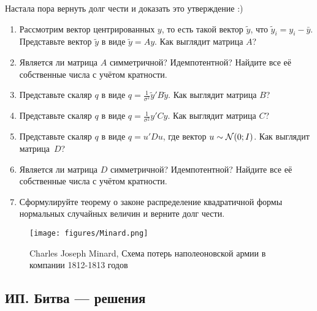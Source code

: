 \documentclass[12pt, a4paper]{article}
\theoremstyle{definition}
\begin{document}
\begin{enumerate}
Настала пора вернуть долг чести и доказать это утверждение :)

\begin{enumerate}
  \item Рассмотрим вектор центрированных $y$, то есть такой вектор $\tilde y$, что $\tilde y_i = y_i - \bar y$. Представьте вектор $\tilde y$ в виде $\tilde y = A y$. Как выглядит матрица $A$?
  \item Является ли матрица $A$ симметричной? Идемпотентной? Найдите все её собственные числа с учётом кратности.
  \item Представьте скаляр $q$ в виде $q= \frac{1}{\sigma^2} \tilde y' B \tilde y$. Как выглядит матрица $B$?
  \item Представьте скаляр $q$ в виде $q= \frac{1}{\sigma^2} y' C y$. Как выглядит матрица $C$?
  \item Представьте скаляр $q$ в виде $q= u' D u$, где вектор $u \sim \mathcal{N}(0; I)$. Как выглядит матрица~$D$?
  \item Является ли матрица $D$ симметричной? Идемпотентной? Найдите все её собственные числа с учётом кратности.
  \item Сформулируйте теорему о законе распределение квадратичной формы нормальных случайных величин и верните долг чести.
\end{enumerate}


\end{enumerate}


\begin{figure}[h!]
\texttt{[image: figures/Minard.png]}
\caption*{Charles Joseph Minard, Схема потерь наполеоновской армии в компании 1812-1813 годов}
\end{figure}



\subsection{ИП. Битва — решения}
\end{document}
